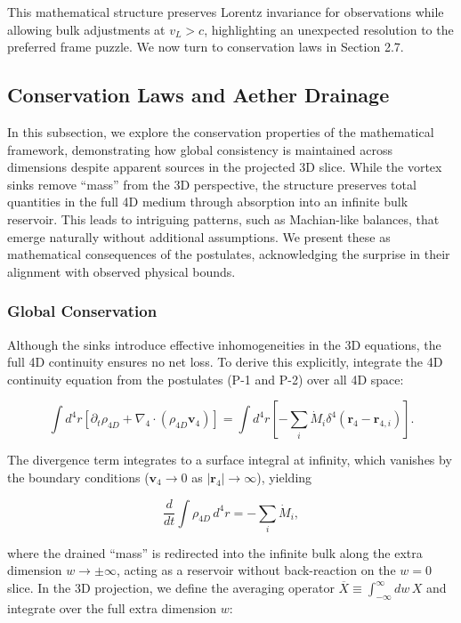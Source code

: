 This mathematical structure preserves Lorentz invariance for observations while allowing bulk adjustments at $v_L > c$, highlighting an unexpected resolution to the preferred frame puzzle. We now turn to conservation laws in Section 2.7.

\subsection{Conservation Laws and Aether Drainage}

In this subsection, we explore the conservation properties of the mathematical framework, demonstrating how global consistency is maintained across dimensions despite apparent sources in the projected 3D slice. While the vortex sinks remove ``mass'' from the 3D perspective, the structure preserves total quantities in the full 4D medium through absorption into an infinite bulk reservoir. This leads to intriguing patterns, such as Machian-like balances, that emerge naturally without additional assumptions. We present these as mathematical consequences of the postulates, acknowledging the surprise in their alignment with observed physical bounds.

\subsubsection{Global Conservation}
Although the sinks introduce effective inhomogeneities in the 3D equations, the full 4D continuity ensures no net loss. To derive this explicitly, integrate the 4D continuity equation from the postulates (P-1 and P-2) over all 4D space:

\begin{equation}
\int d^4 r \left[ \partial_t \rho_{4D} + \nabla_4 \cdot (\rho_{4D} \mathbf{v}_4) \right] = \int d^4 r \left[ -\sum_i \dot{M}_i \delta^4(\mathbf{r}_4 - \mathbf{r}_{4,i}) \right].
\end{equation}

The divergence term integrates to a surface integral at infinity, which vanishes by the boundary conditions ($\mathbf{v}_4 \to 0$ as $|\mathbf{r}_4| \to \infty$), yielding

\begin{equation}
\frac{d}{dt} \int \rho_{4D} \, d^4 r = -\sum_i \dot{M}_i,
\end{equation}

where the drained ``mass'' is redirected into the infinite bulk along the extra dimension $w \to \pm \infty$, acting as a reservoir without back-reaction on the $w=0$ slice. In the 3D projection, we define the averaging operator $\overline{X} \equiv \int_{-\infty}^{\infty} dw \, X$ and integrate over the full extra dimension $w$:


